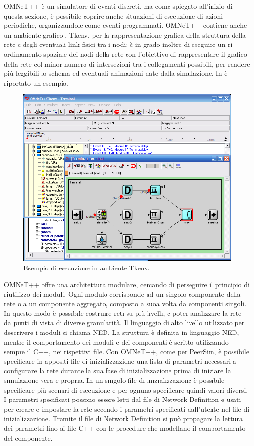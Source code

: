 OMNeT++ è un simulatore di eventi discreti, ma come spiegato all'inizio di questa sezione, è possibile coprire anche situazioni di esecuzione di azioni periodiche, organizzandole come eventi programmati. OMNeT++ contiene anche un ambiente grafico \cite{omnet2002-overview}, Tkenv, per la rappresentazione grafica della struttura della rete e degli eventuali link fisici tra i nodi; è in grado inoltre di eseguire un ri-ordinamento spaziale dei nodi della rete con l'obiettivo di rappresentare il grafico della rete col minor numero di intersezioni tra i collegamenti possibili, per rendere più leggibili lo schema ed eventuali animazioni date dalla simulazione. In  è riportato un esempio.
\begin{figure}[tb]
	\centering
	\includegraphics[width=0.7\linewidth]{Images/omnet/tkenv_01}
	\caption[Ambiente Tkenv]{Esempio di esecuzione in ambiente Tkenv.}
	\label{fig:tkenv_01}
\end{figure}
OMNeT++ offre una architettura modulare, cercando di perseguire il principio di riutilizzo dei moduli\cite{omnet2002-overview}. Ogni modulo corrisponde ad un singolo componente della rete o a un componente aggregato, composto a suoa volta da componenti singoli. In questo modo è possibile costruire reti su più livelli, e poter analizzare la rete da punti di vista di diverse granularità. Il linguaggio di alto livello utilizzato per descrivere i moduli si chiama \acf{NED}. La struttura è definita in linguaggio \acs{NED}, mentre il comportamento dei moduli e dei componenti è scritto utilizzando sempre il C++, nei rispettivi file. 
Con OMNeT++, come per PeerSim,  è possibile specificare in appositi file di inizializzazione una lista di parametri necessari a configurare la rete durante la sua fase di inizializzazione prima di iniziare la simulazione vera e propria.  In un singolo file di inizializzazione è possibile specificare più scenari di esecuzione e per ognuno specificare quindi valori diversi. I parametri specificati possono essere letti dal file di Network Definition e usati per creare e impostare la rete secondo i parametri specificati dall'utente nel file di inizializzazione. Tramite il file di Network Definition si può propagare la lettura dei parametri fino ai file C++ con le procedure che modellano il comportamento del componente.

